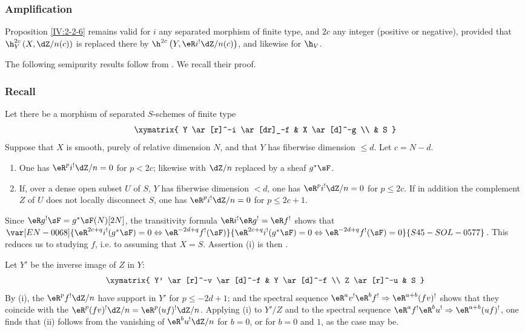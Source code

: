 \subsubsection{Amplification}\label{IV:2-2-7}

Proposition \ref{IV:2-2-6} remains valid for $i$ any separated morphism of
finite type, and $2 c$ any integer (positive or negative), provided that
$\h_Y^{2 c}\left(X,\dZ/n(c)\right)$ is replaced there by
$\h^{2 c}\left(Y,\eR i^!\dZ/n(c)\right)$, and likewise for $\h_V$.

The following semipurity results follow from .
We recall their proof.






\subsubsection{Recall}\label{IV:2-2-8}
Let there be a morphism of separated $S$-schemes of finite type
\[\xymatrix{
  Y \ar[r]^-i \ar[dr]_-f
    & X \ar[d]^-g \\
  & S
}\]
Suppose that $X$ is smooth, purely of relative dimension $N$, and that $Y$
has fiberwise dimension $\leqslant d$. Let $c=N-d$.
\begin{enumerate}[\indent (i)]
  \item One has $\eR^p i^!\dZ/n=0$ for $p<2 c$; likewise with $\dZ/n$
    replaced by a sheaf $g^* \sF$.
  \item If, over a dense open subset $U$ of $S$, $Y$ has fiberwise dimension
    $<d$, one has $\eR^p i^!\dZ/n=0$ for $p\leqslant 2 c$. If in addition
    the complement $Z$ of $U$ does not locally disconnect $S$, one has
    $\eR^pi^!\dZ/n=0$ for $p\leqslant 2 c+1$.
\end{enumerate}
Since $\eR g^! \sF=g^*\sF(N)[2N]$, the transitivity formula
$\eR i^!\eR g^!=\eR f^!$ shows that
$\var[EN-0068]{\eR^{2 c+q} i^!(g^*\sF)=0\Leftrightarrow \eR^{-2 d+q}f^!(\sF)}{\eR^{2 c+q} i^!(g^*\sF)=0\Leftrightarrow \eR^{-2 d+q}f^!(\sF)=0}{S45-SOL-0577}$. This reduces
us to studying $f$, i.e. to assuming that $X=S$. Assertion (i) is then
.

Let $Y'$ be the inverse image of $Z$ in $Y$:
\[\xymatrix{
  Y' \ar[r]^-v \ar[d]^-f
    & Y \ar[d]^-f \\
  Z \ar[r]^-u
    & S
}\]
By (i), the $\eR^p f^! \dZ/n$ have support in $Y'$ for
$p\leqslant -2 d+1$; and the spectral sequence
$\eR^a v^!\eR^b f^! \Rightarrow \eR^{a+b} (f v)^!$ shows that they coincide
with the $\eR^p(f v)^!\dZ/n=\eR^p(u f)^!\dZ/n$. Applying (i) to $Y'/Z$ and
to the spectral sequence
$\eR^a f^!\eR^b u^! \Rightarrow \eR^{a+b} (u f)^!$, one finds that (ii)
follows from the vanishing of $\eR^b u^! \dZ/n$ for $b=0$, or for $b=0$ and
$1$, as the case may be.






